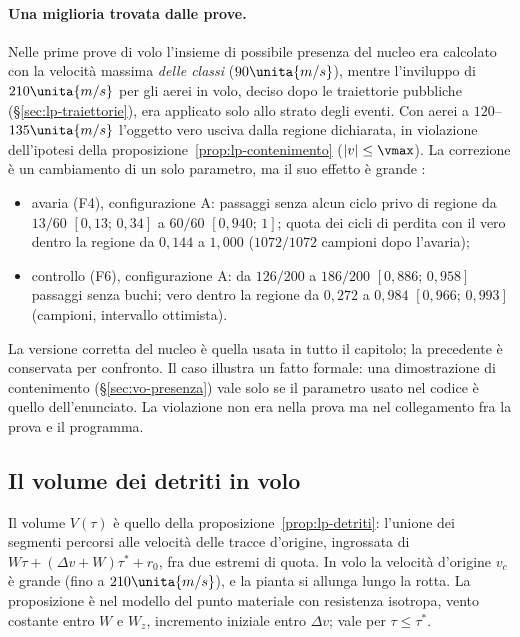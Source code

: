 \paragraph{Una miglioria trovata dalle prove.} Nelle prime prove di volo l'insieme di possibile presenza del nucleo era calcolato con la velocità massima \emph{delle classi} ($90\unita{m/s}$), mentre l'inviluppo di $210\unita{m/s}$ per gli aerei in volo, deciso dopo le traiettorie pubbliche (\S\ref{sec:lp-traiettorie}), era applicato solo allo strato degli eventi. Con aerei a $120$--$135\unita{m/s}$ l'oggetto vero usciva dalla regione dichiarata, in violazione dell'ipotesi della proposizione~\ref{prop:lp-contenimento} ($|v|\le\vmax$). La correzione è un cambiamento di un solo parametro, ma il suo effetto è grande :
\begin{itemize}
\item avaria (F4), configurazione A: passaggi senza alcun ciclo privo di regione da $13/60$ $[0{,}13;\,0{,}34]$ a $60/60$ $[0{,}940;\,1]$; quota dei cicli di perdita con il vero dentro la regione da $0{,}144$ a $1{,}000$ ($1072/1072$ campioni dopo l'avaria);
\item controllo (F6), configurazione A: da $126/200$ a $186/200$ $[0{,}886;\,0{,}958]$ passaggi senza buchi; vero dentro la regione da $0{,}272$ a $0{,}984$ $[0{,}966;\,0{,}993]$ (campioni, intervallo ottimista).
\end{itemize}
La versione corretta del nucleo è quella usata in tutto il capitolo; la precedente è conservata per confronto. Il caso illustra un fatto formale: una dimostrazione di contenimento (\S\ref{sec:vo-presenza}) vale solo se il parametro usato nel codice è quello dell'enunciato. La violazione non era nella prova ma nel collegamento fra la prova e il programma.

\subsection{Il volume dei detriti in volo}\label{sec:vo-detriti}

Il volume $V(\tau)$ è quello della proposizione~\ref{prop:lp-detriti}: l'unione dei segmenti percorsi alle velocità delle tracce d'origine, ingrossata di $W\tau+(\Delta v+W)\tau^*+r_0$, fra due estremi di quota. In volo la velocità d'origine $v_c$ è grande (fino a $210\unita{m/s}$), e la pianta si allunga lungo la rotta. La proposizione è  nel modello del punto materiale con resistenza isotropa, vento costante entro $W$ e $W_z$, incremento iniziale entro $\Delta v$; vale per $\tau\le\tau^*$.

